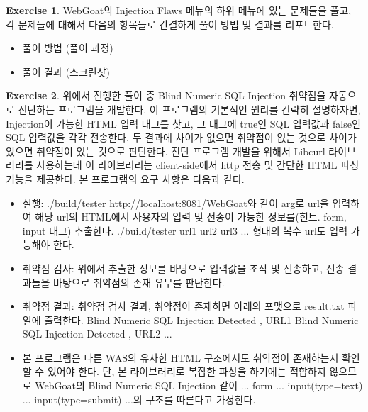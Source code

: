 \documentclass[a4paper, 11pt]{article}
\theoremstyle{definition}
\newtheorem{exercise}{Exercise}
\begin{document}
\begin{exercise}

WebGoat의 Injection Flaws 메뉴의 하위 메뉴에 있는 문제들을 풀고, 각 문제들에 대해서 다음의 항목들로 간결하게 풀이 방법 및 결과를 리포트한다. 

\begin{itemize}
  \item 풀이 방법 (풀이 과정)
  \item 풀이 결과 (스크린샷)
\end{itemize}

\end{exercise}

\begin{exercise}

위에서 진행한 풀이 중 Blind Numeric SQL Injection 취약점을 자동으로 진단하는 프로그램을 개발한다. 
이 프로그램의 기본적인 원리를 간략히 설명하자면, 
Injection이 가능한 HTML 입력 태그를 찾고, 그 태그에 true인 SQL 입력값과 false인 SQL 입력값을 각각 전송한다. 
두 결과에 차이가 없으면 취약점이 없는 것으로 차이가 있으면 취약점이 있는 것으로 판단한다. 
진단 프로그램 개발을 위해서 Libcurl\cite{libcurl} 라이브러리를 사용하는데
이 라이브러리는 client-side에서 http 전송 및 간단한 HTML 파싱 기능을 제공한다. 
본 프로그램의 요구 사항은 다음과 같다. 

\begin{itemize}
  \item 실행: ./build/tester http://localhost:8081/WebGoat와 같이 arg로 url을 입력하여 해당 url의 HTML에서 사용자의 입력 및 전송이 가능한 정보를(힌트. form, input 태그) 추출한다. \cite{href} ./build/tester url1  url2  url3 ... 형태의 복수 url도 입력 가능해야 한다.  
  \item 취약점 검사: 위에서 추출한 정보를 바탕으로 입력값을 조작 및 전송하고,\cite{post} 전송 결과들을 바탕으로 취약점의 존재 유무를 판단한다. \cite{getinfo}
  \item 취약점 결과: 취약점 검사 결과, 취약점이 존재하면 아래의 포맷으로 result.txt 파일에 출력한다. \newline  
  Blind Numeric SQL Injection Detected , URL1 \newline 
  Blind Numeric SQL Injection Detected , URL2 \newline
                     ...  

  \item 본 프로그램은 다른 WAS의 유사한 HTML 구조에서도 취약점이 존재하는지 확인할 수 있어야 한다. 
  단, 본 라이브러리로 복잡한 파싱을 하기에는 적합하지 않으므로 WebGoat의 Blind Numeric SQL Injection 같이
  ... form ... input(type=text) ... input(type=submit) ...의 구조를 따른다고 가정한다. 
\end{itemize}

\end{exercise}
\end{document}
